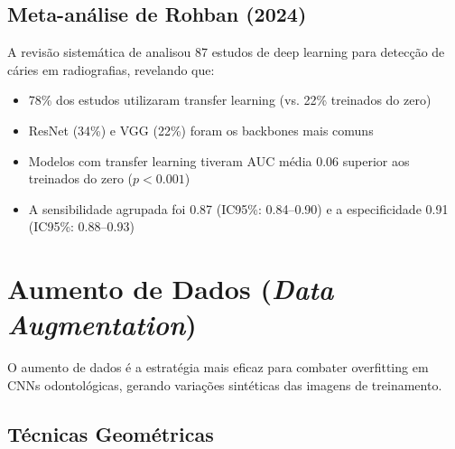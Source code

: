 
\subsection{Meta-análise de Rohban (2024)}

A revisão sistemática de  analisou 87 estudos de deep
learning para detecção de cáries em radiografias, revelando que:

\begin{itemize}
  \item 78\% dos estudos utilizaram transfer learning (vs. 22\% treinados do zero)
  \item ResNet (34\%) e VGG (22\%) foram os backbones mais comuns
  \item Modelos com transfer learning tiveram AUC média 0.06 superior aos
        treinados do zero ($p < 0.001$)
  \item A sensibilidade agrupada foi 0.87 (IC95\%: 0.84--0.90) e a especificidade
        0.91 (IC95\%: 0.88--0.93)
\end{itemize}

\section{Aumento de Dados (\textit{Data Augmentation})}
\label{sec:data-augmentation}

O aumento de dados é a estratégia mais eficaz para combater overfitting em CNNs
odontológicas, gerando variações sintéticas das imagens de treinamento.

\subsection{Técnicas Geométricas}

